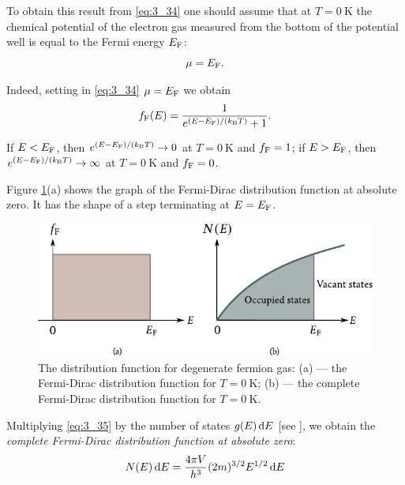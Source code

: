 To obtain this result from \eqref{eq:3_34} one should assume that at $T=\SI{0}{\kelvin}$ the chemical potential of the electron gas measured from the bottom of the potential well is equal to the Fermi energy $E_{\text{F}}$:
\begin{equation}\label{eq:3_36}
    \mu = E_{\text{F}}.
\end{equation}

\noindent
Indeed, setting in \eqref{eq:3_34} $\mu = E_{\text{F}}$ we obtain
\begin{equation}\label{eq:3_37}
    f_{\text{F}}(E) = \frac{1}{e^{(E - E_{\text{F}})/(k_{\text{B}} T)} + 1}.
\end{equation}

\noindent
If $E<E_{\text{F}}$, then $e^{(E - E_{\text{F}})/(k_{\text{B}} T)}\to 0$ at $T=\SI{0}{\kelvin}$ and $f_{\text{F}}=1$; if $E>E_{\text{F}}$, then $e^{(E - E_{\text{F}})/(k_{\text{B}} T)}\to\infty$ at $T=\SI{0}{\kelvin}$ and $f_{\text{F}}=0$.

Figure \ref{fig:3_5}(a) shows the graph of the Fermi-Dirac distribution function at absolute zero. It has the shape of a step terminating at $E=E_{\text{F}}$.

\begin{figure}[t]
	\begin{center}
		\includegraphics[scale=1]{figures/ch_03/fig_3_5.pdf}
		\caption[]{The distribution function for degenerate fermion gas: (a) --- the Fermi-Dirac distribution function for $T=\SI{0}{\kelvin}$; (b) --- the complete Fermi-Dirac distribution function for $T=\SI{0}{\kelvin}$.}
		\label{fig:3_5}
	\end{center}
	\vspace{-0.7cm}
\end{figure}

Multiplying \eqref{eq:3_35} by the number of states $g(E)\,\mathrm{d} E$ [see ], we obtain the \textit{complete Fermi-Dirac distribution function at absolute zero}:
\begin{equation}\label{eq:3_38}
    N(E)\, \mathrm{d} E = \frac{4\pi V}{h^3} (2m)^{3/2} E^{1/2}\, \mathrm{d} E
\end{equation}

